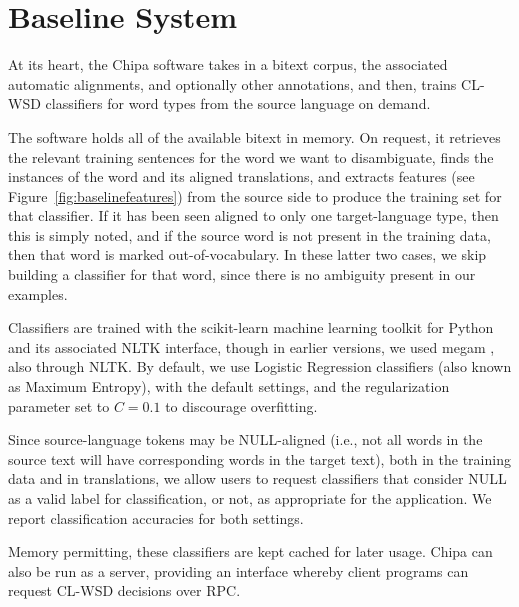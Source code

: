 \section{Baseline System}
At its heart, the Chipa software takes in a bitext corpus, the associated
automatic alignments, and optionally other annotations, and then, trains CL-WSD
classifiers for word types from the source language on demand. 

The software holds all of the available bitext in memory. On request, it
retrieves the relevant training sentences for the word we want to disambiguate,
finds the instances of the word and its aligned translations, and extracts
features (see Figure~\ref{fig:baselinefeatures}) from the source side to
produce the training set for that classifier.  If it has been seen aligned to
only one target-language type, then this is simply noted, and if the source
word is not present in the training data, then that word is marked
out-of-vocabulary. In these latter two cases, we skip building a classifier for
that word, since there is no ambiguity present in our examples.

Classifiers are trained with the scikit-learn machine learning toolkit
\cite{scikit-learn} for Python and its associated NLTK interface, though in
earlier versions, we used megam \cite{daume04cg-bfgs}, also through NLTK.
By default, we use Logistic Regression classifiers (also known as Maximum
Entropy), with the default settings, and the regularization parameter set to
$C=0.1$ to discourage overfitting.

Since source-language tokens may be NULL-aligned (i.e., not all words in the
source text will have corresponding words in the target text), both in the
training data and in translations, we allow users to request classifiers that
consider NULL as a valid label for classification, or not, as appropriate for
the application. We report classification accuracies for both settings.

Memory permitting, these classifiers are kept cached for later usage. Chipa can
also be run as a server, providing an interface whereby client programs can
request CL-WSD decisions over RPC.

